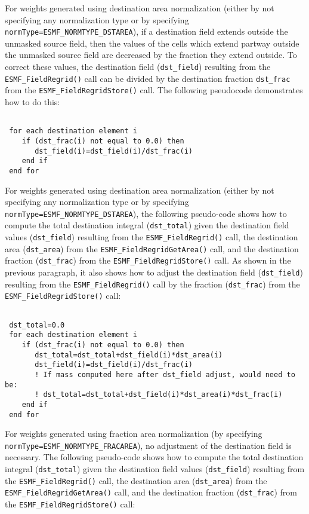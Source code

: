 For weights generated using destination area normalization (either by not specifying any normalization type or by specifying {\tt normType=ESMF\_NORMTYPE\_DSTAREA}), if a destination field extends 
outside the unmasked source field, then the values of the cells which 
extend partway outside the unmasked source field are decreased by the fraction they extend outside. 
To correct these values, the destination field ({\tt dst\_field}) resulting
from the {\tt ESMF\_FieldRegrid()} call can be divided by the destination fraction {\tt dst\_frac} 
from the {\tt ESMF\_FieldRegridStore()} call. The following pseudocode demonstrates  how to do this:

\begin{verbatim}

 for each destination element i
    if (dst_frac(i) not equal to 0.0) then
       dst_field(i)=dst_field(i)/dst_frac(i)
    end if
 end for
\end{verbatim}

For weights generated using destination area normalization (either by not specifying any normalization type or by specifying {\tt normType=ESMF\_NORMTYPE\_DSTAREA}), 
the following pseudo-code shows how to compute the total destination integral ({\tt dst\_total}) given the
destination field values ({\tt dst\_field}) resulting
from the {\tt ESMF\_FieldRegrid()} call, the destination area ({\tt dst\_area}) from the {\tt ESMF\_FieldRegridGetArea()} call,  and the destination fraction ({\tt dst\_frac}) from the {\tt ESMF\_FieldRegridStore()} call. As shown in the previous paragraph, it also 
shows how to adjust the destination field ({\tt dst\_field}) resulting from the {\tt ESMF\_FieldRegrid()} call by the
fraction ({\tt dst\_frac}) from the {\tt ESMF\_FieldRegridStore()} call: 

\begin{verbatim}

 dst_total=0.0
 for each destination element i
    if (dst_frac(i) not equal to 0.0) then
       dst_total=dst_total+dst_field(i)*dst_area(i) 
       dst_field(i)=dst_field(i)/dst_frac(i)
       ! If mass computed here after dst_field adjust, would need to be:
       ! dst_total=dst_total+dst_field(i)*dst_area(i)*dst_frac(i) 
    end if
 end for
\end{verbatim}

For weights generated using fraction area normalization (by specifying {\tt normType=ESMF\_NORMTYPE\_FRACAREA}),
no adjustment of the destination field is necessary. The following pseudo-code shows how to compute 
the total destination integral ({\tt dst\_total}) given the
destination field values ({\tt dst\_field}) resulting
from the {\tt ESMF\_FieldRegrid()} call, the destination area ({\tt dst\_area}) from the {\tt ESMF\_FieldRegridGetArea()}
call,  and the destination fraction ({\tt dst\_frac}) from the {\tt ESMF\_FieldRegridStore()} call:

